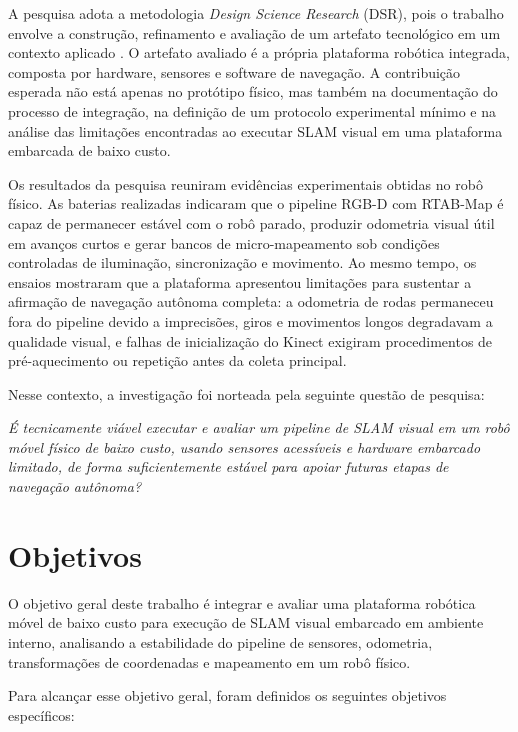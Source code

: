 A pesquisa adota a metodologia \textit{Design Science Research} (DSR), pois o trabalho envolve a construção, refinamento e avaliação de um artefato tecnológico em um contexto aplicado \cite{hevner2004designscienceinformation, dresch2015distinctiveanalysiscase}. O artefato avaliado é a própria plataforma robótica integrada, composta por hardware, sensores e software de navegação. A contribuição esperada não está apenas no protótipo físico, mas também na documentação do processo de integração, na definição de um protocolo experimental mínimo e na análise das limitações encontradas ao executar SLAM visual em uma plataforma embarcada de baixo custo.

Os resultados da pesquisa reuniram evidências experimentais obtidas no robô físico. As baterias realizadas indicaram que o pipeline RGB-D com RTAB-Map é capaz de permanecer estável com o robô parado, produzir odometria visual útil em avanços curtos e gerar bancos de micro-mapeamento sob condições controladas de iluminação, sincronização e movimento. Ao mesmo tempo, os ensaios mostraram que a plataforma apresentou limitações para sustentar a afirmação de navegação autônoma completa: a odometria de rodas permaneceu fora do pipeline devido a imprecisões, giros e movimentos longos degradavam a qualidade visual, e falhas de inicialização do Kinect exigiram procedimentos de pré-aquecimento ou repetição antes da coleta principal.

Nesse contexto, a investigação foi norteada pela seguinte questão de pesquisa:

\begin{center}
    \textit{É tecnicamente viável executar e avaliar um pipeline de SLAM visual em um robô móvel físico de baixo custo, usando sensores acessíveis e hardware embarcado limitado, de forma suficientemente estável para apoiar futuras etapas de navegação autônoma?}
\end{center}

\section{Objetivos}

O objetivo geral deste trabalho é integrar e avaliar uma plataforma robótica móvel de baixo custo para execução de SLAM visual embarcado em ambiente interno, analisando a estabilidade do pipeline de sensores, odometria, transformações de coordenadas e mapeamento em um robô físico.

Para alcançar esse objetivo geral, foram definidos os seguintes objetivos específicos:

